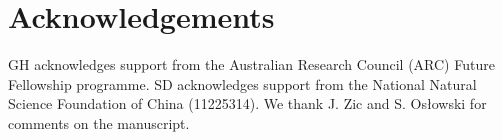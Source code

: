 \documentclass{raa}            %
\begin{document}
\section{Acknowledgements}

GH acknowledges support from the Australian Research Council (ARC) Future Fellowship programme.  SD acknowledges support from the National Natural Science Foundation of China (11225314).  We thank J. Zic and S. Os{\l}owski for comments on the manuscript. 
{}



\label{lastpage}
\end{document}
